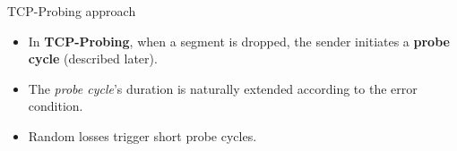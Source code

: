 \begin{frame}{TCP-Probing approach}
   \begin{itemize}
	\item In \textbf{TCP-Probing}, when a segment is dropped, the
	sender initiates a \textbf{probe cycle} (described later).
	\item The \textit{probe cycle}'s duration is naturally extended
	 according to the error condition.
	\item Random losses trigger short probe cycles.
   \end{itemize}
\end{frame}
